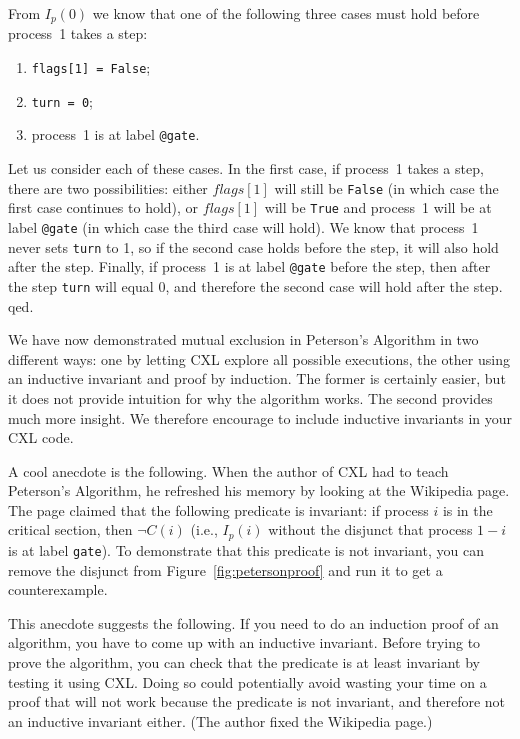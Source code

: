 \documentclass{report}
\begin{document}
From $I_p(0)$ we know that one of the following three cases must hold before
process~1 takes a step:
\begin{enumerate}
\item \texttt{flags[1] = False};
\item \texttt{turn = 0};
\item process~1 is at label \texttt{@gate}.
\end{enumerate}

Let us consider each of these cases.
In the first case, if process~1 takes a step, there are two possibilities:
either $flags[1]$ will still be \texttt{False} (in which case the first case
continues to hold), or $flags[1]$ will be \texttt{True}
and process~1 will be at label \texttt{@gate} (in which case the third case
will hold).
We know that process~1 never sets \texttt{turn} to 1, so
if the second case holds before the step, it will also hold after the step.
Finally, if process~1 is at label \texttt{@gate} before the step, then after
the step \texttt{turn} will equal 0, and therefore the second case will hold
after the step.  qed.

We have now demonstrated mutual exclusion in Peterson's Algorithm in two
different ways: one by letting CXL explore all possible executions, the
other using an inductive invariant and proof by induction.  The former
is certainly easier, but it does not provide intuition for why the
algorithm works.  The second provides much more insight.  We therefore
encourage to include inductive invariants in your CXL code.

A cool anecdote is the following.  When the author of CXL had to teach
Peterson's Algorithm, he refreshed his memory by looking at the Wikipedia
page.  The page claimed that the following predicate is invariant:
if process $i$ is in the critical section, then $\lnot C(i)$ (i.e.,
$I_p(i)$ without the disjunct that process $1-i$ is at label \texttt{gate}).
To demonstrate that this predicate is not invariant, you can remove the
disjunct from Figure~\ref{fig:petersonproof} and run it to get a
counterexample.

This anecdote suggests the following.  If you need to do an induction
proof of an algorithm, you have to come up with an inductive invariant.
Before trying to prove the algorithm, you can check that the predicate is
at least invariant by testing it using CXL.  Doing so could potentially
avoid wasting your time on a proof that will not work because the
predicate is not invariant, and therefore not an inductive invariant either.
(The author fixed the Wikipedia page.)
\end{document}
